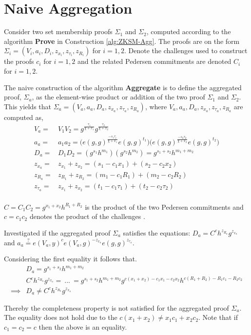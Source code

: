 \chapter{Naive Aggregation }
\label{appendix:naiveAgg}
Consider two set membership proofs $\Sigma_1$ and $\Sigma_2$, computed according to the algorithm \textbf{Prove} in Construction \ref{alg:ZKSM-Agg}. The proofs are on the form $\Sigma_i = (V_i,a_i,D_i,z_{x_i},z_{\tau_i},z_{R_i})$ for $i=1,2$.  Denote the challenges used to construct the proofs $c_i$ for $i=1,2$ and the related Pedersen commitments are denoted $C_i$  for $i=1,2$.

The naive construction of the algorithm \textbf{Aggregate} is to
define the aggregated proof, $\Sigma_a$, as the  element-wise product or addition of the two proof $\Sigma_1$ and $\Sigma_2$. This yields that $\Sigma_a = (V_a,a_a,D_a,z_{x_a},z_{\tau_a },z_{R_a})$, where $V_a, a_a, D_a,z_{x_a},z_{\tau_a },z_{R_a}$ are computed as,
\begin{equation}
\begin{aligned}
\label{eq:naiveAgg}
V_a =& V_1V_2 = g^{\frac{\tau_1}{\chi + x_1}}g^{\frac{\tau_2}{\chi + x_2}}\\
a_a =& a_1a_2 = \big( e(g,g)^{\frac{-s_1\tau_i}{\chi+x_1}}e(g,g)^{t_1}\big) \big( e(g,g)^{\frac{-s_2\tau_2}{\chi+x_2}}e(g,g)^{t_2}\big) \\
D_a =& D_1D_2 = ( g^{s_1}h^{m_1} ) (g^{s_2} h^{m_2}) = g^{s_1+s_2}h^{m_1+m_2}\\
z_{x_a} =& z_{x_1} + z_{x_2} = (s_1-c_1x_1)+(s_2-c_2x_2)\\
z_{R_a} =& z_{R_1} + z_{R_2} = (m_1-c_1R_1)+(m_2-c_2R_2)\\
z_{\tau_a} =& z_{x_1} + z_{x_2} = (t_1-c_1\tau_1)+(t_2-c_2\tau_2)\\ 
\end{aligned} 
\end{equation}

$C=C_1C_2 = g^{x_1+x_2}h^{R_1+R_2}$ is the product of the two Pedersen commitments and $c=c_1c_2$ denotes the product of the challenges .

Investigated if the aggregated proof $\Sigma_a$ satisfies the equations: $D_a = C^ch^{z_{R_a}}g^{z_{x_a}}$ and  $a_a \overset{?}{=} e(V_a,y)^ce(V_a,g)^{-z_{x_a}}e(g,g)^{z_{\tau_a}}$.

Considering the first equality it follows that.
\begin{align*}
&D_a = g^{s_1+s_2}h^{m_1+m_2} \\
&C^ch^{z_{R_a}}g^{z_{x_a}} =\: ... \:= g^{s_1+s_2} h^{m_1+m_2} g^{c(x_1+x_2) - c_1x_1 -c_2x_2}h^{c(R_1+R_2)-R_1c_1-R_2c_2} \\
\implies & D_a \neq C^ch^{z_{R_a}}g^{z_{x_a}} 
\end{align*}

Thereby the completeness property is not satisfied for the aggregated proof $\Sigma_a$. The equality does not hold due to the $ c(x_1+x_2)  \neq x_1c_1 + x_2c_2$. Note that if $c_1=c_2=c$ then the above is an equality.
